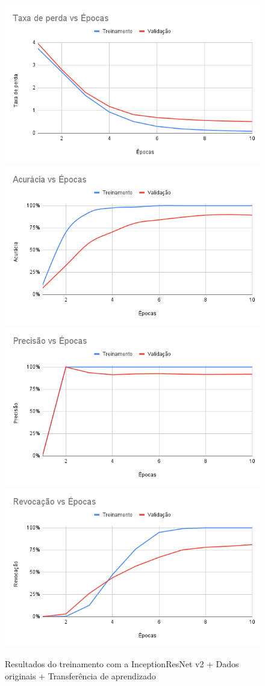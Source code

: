 \documentclass[
	12pt,				%
	oneside,			%
	a4paper,			%
	english,			%
	brazil				%
	]{abntex2ppgsi}
\begin{document}
\begin{figure}[H]
    \centering
    \caption{Resultados do treinamento com a InceptionResNet v2 + Dados originais + Transferência de aprendizado}
    \includegraphics[width=.50\textwidth]{imagens/resultados_discussao/architecture/inception_resnet_v2/transfer_learning/original/perda.png}\hfill
    \includegraphics[width=.50\textwidth]{imagens/resultados_discussao/architecture/inception_resnet_v2/transfer_learning/original/acuracia.png}\bigbreak    \includegraphics[width=.50\textwidth]{imagens/resultados_discussao/architecture/inception_resnet_v2/transfer_learning/original/precisao.png}\hfill
    \includegraphics[width=.50\textwidth]{imagens/resultados_discussao/architecture/inception_resnet_v2/transfer_learning/original/revocacao.png}
    \label{fig:inception_resnet_v2_original_transferencia_aprendizado}
\end{figure}
\end{document}
